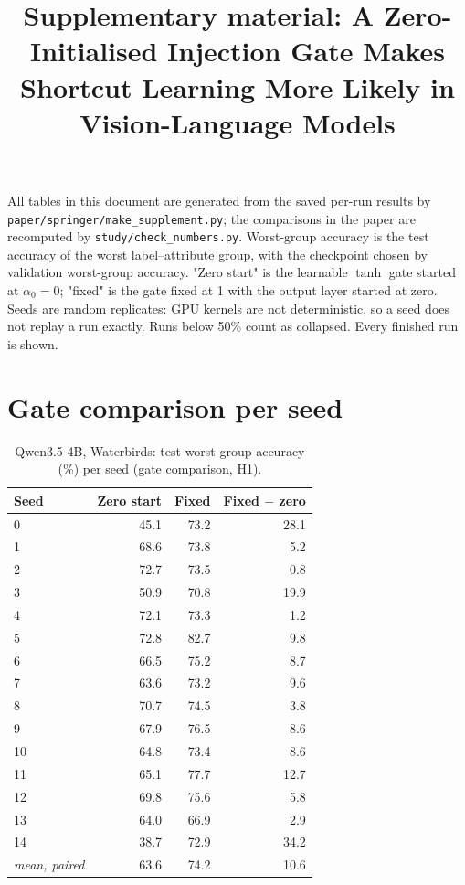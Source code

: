 \documentclass[10pt]{article}
\title{Supplementary material: A Zero-Initialised Injection Gate Makes Shortcut Learning More Likely in
Vision-Language Models}
\date{}
\begin{document}
\maketitle
\noindent All tables in this document are generated from the saved per-run results by
\texttt{paper/springer/make\_supplement.py}; the comparisons in the paper are recomputed by
\texttt{study/check\_numbers.py}. Worst-group accuracy is the test accuracy of the worst label--attribute group,
with the checkpoint chosen by validation worst-group accuracy. "Zero start" is the learnable $\tanh$ gate started
at $\alpha_0 = 0$; "fixed" is the gate fixed at 1 with the output layer started at zero. Seeds are random
replicates: GPU kernels are not deterministic, so a seed does not replay a run exactly. Runs below 50\% count as
collapsed. Every finished run is shown.

\section{Gate comparison per seed}
\begin{longtable}{lrrr}
\caption{Qwen3.5-4B, Waterbirds: test worst-group accuracy (\%) per seed (gate comparison, H1).}\label{tab:s-h1-water}\\
\toprule
Seed & Zero start & Fixed & Fixed $-$ zero \\ \midrule
\endhead
0 & 45.1 & 73.2 & 28.1 \\
1 & 68.6 & 73.8 & 5.2 \\
2 & 72.7 & 73.5 & 0.8 \\
3 & 50.9 & 70.8 & 19.9 \\
4 & 72.1 & 73.3 & 1.2 \\
5 & 72.8 & 82.7 & 9.8 \\
6 & 66.5 & 75.2 & 8.7 \\
7 & 63.6 & 73.2 & 9.6 \\
8 & 70.7 & 74.5 & 3.8 \\
9 & 67.9 & 76.5 & 8.6 \\
10 & 64.8 & 73.4 & 8.6 \\
11 & 65.1 & 77.7 & 12.7 \\
12 & 69.8 & 75.6 & 5.8 \\
13 & 64.0 & 66.9 & 2.9 \\
14 & 38.7 & 72.9 & 34.2 \\
\textit{mean, paired} & 63.6 & 74.2 & 10.6 \\
\bottomrule
\end{longtable}
\end{document}

